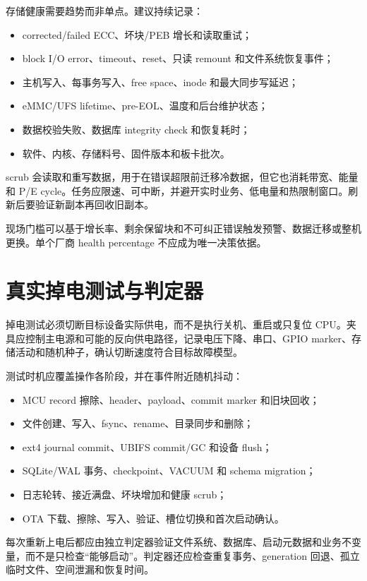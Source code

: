 存储健康需要趋势而非单点。建议持续记录：

\begin{itemize}
  \item corrected/failed ECC、坏块/PEB 增长和读取重试；
  \item block I/O error、timeout、reset、只读 remount 和文件系统恢复事件；
  \item 主机写入、每事务写入、free space、inode 和最大同步写延迟；
  \item eMMC/UFS lifetime、pre-EOL、温度和后台维护状态；
  \item 数据校验失败、数据库 integrity check 和恢复耗时；
  \item 软件、内核、存储料号、固件版本和板卡批次。
\end{itemize}

scrub 会读取和重写数据，用于在错误超限前迁移冷数据，但它也消耗带宽、能量和 P/E cycle。任务应限速、可中断，并避开实时业务、低电量和热限制窗口。刷新后要验证新副本再回收旧副本。

现场门槛可以基于增长率、剩余保留块和不可纠正错误触发预警、数据迁移或整机更换。单个厂商 health percentage 不应成为唯一决策依据。

\section{真实掉电测试与判定器}

掉电测试必须切断目标设备实际供电，而不是执行关机、重启或只复位 CPU。夹具应控制主电源和可能的反向供电路径，记录电压下降、串口、GPIO marker、存储活动和随机种子，确认切断速度符合目标故障模型。

测试时机应覆盖操作各阶段，并在事件附近随机抖动：

\begin{itemize}
  \item MCU record 擦除、header、payload、commit marker 和旧块回收；
  \item 文件创建、写入、fsync、rename、目录同步和删除；
  \item ext4 journal commit、UBIFS commit/GC 和设备 flush；
  \item SQLite/WAL 事务、checkpoint、VACUUM 和 schema migration；
  \item 日志轮转、接近满盘、坏块增加和健康 scrub；
  \item OTA 下载、擦除、写入、验证、槽位切换和首次启动确认。
\end{itemize}

每次重新上电后都应由独立判定器验证文件系统、数据库、启动元数据和业务不变量，而不是只检查“能够启动”。判定器还应检查重复事务、generation 回退、孤立临时文件、空间泄漏和恢复时间。

